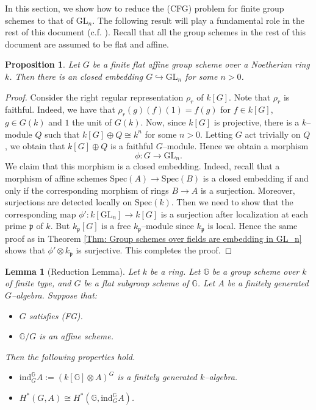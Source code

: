 \documentclass{article}
\theoremstyle{plain}
\newtheorem{Lemma}[Th]{Lemma}
\newtheorem{Prop}[Th]{Proposition}
\theoremstyle{definition}
\newcommand{\GL}{\mathrm{GL}}
\begin{document}
In this section, we show how to reduce the (CFG) problem for finite group schemes to that of $\GL_n$. The following result will play a fundamental role in the rest of this document (c.f. \cite[Exp. VIB, Proposition 3.15]{SGA3I}). Recall that all the group schemes in the rest of this document are assumed to be flat and affine.

\begin{Prop}\label{embedding of G}
 Let $G$ be a finite flat affine group scheme over a Noetherian ring $k$. Then there is an closed embedding $G\hookrightarrow \GL_n$ for some $n>0$.
\end{Prop}

\begin{proof}
   Consider the right regular representation $\rho_r$ of $k[G]$. Note that $\rho_r$ is faithful. Indeed, we have that $\rho_r(g)(f)(1)=f(g)$ for $f\in k[G]$, $g\in G(k)$ and $1$ the unit of $G(k)$. Now, since  $k[G]$ is projective, there is a $k$--module $Q$ such that $k[G]\oplus Q\cong k^n$ for some $n>0$. Letting $G$ act trivially on $Q$, we obtain that $k[G]\oplus Q$ is a faithful $G$--module. Hence we obtain a morphism \[\phi\colon G\to \GL_n.\] We claim that this morphism is a closed embedding. Indeed, recall that a morphism of affine schemes $\mathrm{Spec}(A)
   \to \mathrm{Spec}(B) $ is a closed embedding if and only if the corresponding morphism of rings $B\to A$ is a surjection. Moreover, surjections are detected locally on $\mathrm{Spec}(k)$. Then we need to show that the corresponding map $\phi'\colon k[\GL_n]\to k[G]$ is a surjection after localization at each prime $\mathfrak{p}$ of $k$. But $k_\mathfrak{p}[G]$ is a free $k_\mathfrak{p}$--module since $k_\mathfrak{p}$ is local. Hence the same proof as in Theorem \ref{Thm: Group schemes over fields are embedding in GL_n}   
   shows that $\phi'\otimes k_\mathfrak{p}$ is surjective. This completes the proof. 
\end{proof}


\begin{Lemma}[Reduction Lemma]\label{vdK's Reduction Lemma} Let $k$ be a ring. Let $\mathbb{G}$ be a group scheme over $k$ of finite type, and $G$ be a flat subgroup scheme of $\mathbb{G}$. Let $A$ be a finitely generated $G$--algebra. Suppose that:
\begin{itemize}
    \item[$(i)$] $G$ satisfies (FG).
    \item[$(ii)$] $\mathbb{G}/G$ is an affine scheme. 
\end{itemize}
   \noindent Then the following properties hold. 
   \begin{itemize}
       \item[(a)] $\mathrm{ind}_G^\mathbb{G} A:= (k[\mathbb{G}]\otimes A)^G$ is a finitely generated $k$--algebra.  
       \item[(b)] $H^\ast(G,A)\cong H^\ast(\mathbb{G},\mathrm{ind}_G^\mathbb{G} A)$.
   \end{itemize}
\end{Lemma} 
\end{document}
